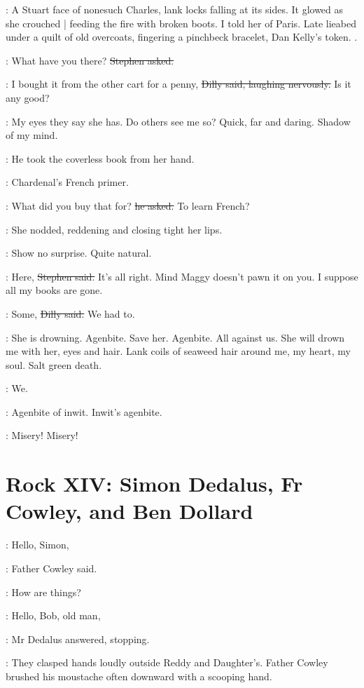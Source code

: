 \StephenInt:
A Stuart face of nonesuch Charles,
lank locks falling at its sides.
It glowed as she crouched |
feeding the fire with broken boots.
I told her of Paris.
Late lieabed under a quilt of old overcoats,
fingering a pinchbeck bracelet,
Dan Kelly's token.
.

\Stephen:
What have you there?
\sout{Stephen asked.}

\dilly:
I bought it from the other cart for a penny,
\sout{Dilly said, laughing nervously.}
Is it any good?

\StephenInt:
My eyes they say she has.
Do others see me so?
Quick, far and daring.
Shadow of my mind.

:
He took the coverless book from her hand.

\StephenInt:
Chardenal's French primer.

\Stephen:
What did you buy that for?
\sout{he asked.}
To learn French?

:
She nodded,
reddening and closing tight her lips.

\StephenInt:
Show no surprise.
Quite natural.

\Stephen:
Here,
\sout{Stephen said.}
It's all right.
Mind Maggy doesn't pawn it on you.
I suppose all my books are gone.

\dilly:
Some,
\sout{Dilly said.}
We had to.

\StephenInt:
She is drowning.
Agenbite.
Save her.
Agenbite.
All against us.
She will drown me with her,
eyes and hair.
Lank coils of seaweed hair around me,
my heart,
my soul.
Salt green death.

\StephenInt:
We.

\StephenInt:
Agenbite of inwit.
Inwit's agenbite.

\StephenInt:
Misery!
Misery!


\section*{Rock XIV: Simon Dedalus, Fr Cowley, and Ben Dollard}


\cowley:
Hello, Simon,

:
Father Cowley said.

\cowley:
How are things?

\simon:
Hello, Bob, old man,

:
Mr Dedalus answered,
stopping.

:
They clasped hands loudly outside Reddy and Daughter's.
Father Cowley brushed his moustache often downward
with a scooping hand.

